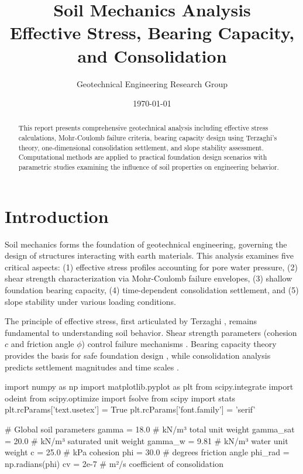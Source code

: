 \documentclass[11pt,a4paper]{article}
\title{Soil Mechanics Analysis\\Effective Stress, Bearing Capacity, and Consolidation}
\author{Geotechnical Engineering Research Group}
\date{\today}
\begin{document}
\maketitle

\begin{abstract}
This report presents comprehensive geotechnical analysis including effective stress calculations, Mohr-Coulomb failure criteria, bearing capacity design using Terzaghi's theory, one-dimensional consolidation settlement, and slope stability assessment. Computational methods are applied to practical foundation design scenarios with parametric studies examining the influence of soil properties on engineering behavior.
\end{abstract}

\section{Introduction}

Soil mechanics forms the foundation of geotechnical engineering, governing the design of structures interacting with earth materials. This analysis examines five critical aspects: (1) effective stress profiles accounting for pore water pressure, (2) shear strength characterization via Mohr-Coulomb failure envelopes, (3) shallow foundation bearing capacity, (4) time-dependent consolidation settlement, and (5) slope stability under various loading conditions.

The principle of effective stress, first articulated by Terzaghi \cite{terzaghi1943}, remains fundamental to understanding soil behavior. Shear strength parameters (cohesion $c$ and friction angle $\phi$) control failure mechanisms \cite{lambe1969}. Bearing capacity theory provides the basis for safe foundation design \cite{meyerhof1963}, while consolidation analysis predicts settlement magnitudes and time scales \cite{taylor1948}.

\begin{pycode}
import numpy as np
import matplotlib.pyplot as plt
from scipy.integrate import odeint
from scipy.optimize import fsolve
from scipy import stats
plt.rcParams['text.usetex'] = True
plt.rcParams['font.family'] = 'serif'

# Global soil parameters
gamma = 18.0  # kN/m³ total unit weight
gamma_sat = 20.0  # kN/m³ saturated unit weight
gamma_w = 9.81  # kN/m³ water unit weight
c = 25.0  # kPa cohesion
phi = 30.0  # degrees friction angle
phi_rad = np.radians(phi)
cv = 2e-7  # m²/s coefficient of consolidation
\end{pycode}
\end{document}
